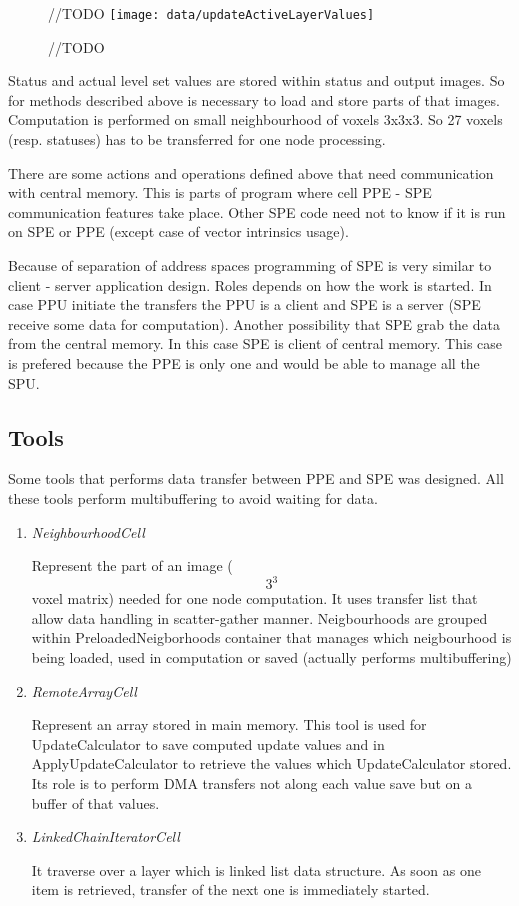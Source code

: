 \begin{figure}	//TODO
    \centering
    \texttt{[image: data/updateActiveLayerValues]}
    \caption[Diagram of new design components]{//TODO}
    \label{fg:updateActiveLayerValues}
\end{figure}

Status and actual level set values are stored within status and output images.
So for methods described above is necessary to load and store parts of that images.
Computation is performed on small neighbourhood of voxels 3x3x3.
So 27 voxels (resp. statuses) has to be transferred for one node processing.

There are some actions and operations defined above that need communication with central memory.
This is parts of program where cell PPE - SPE communication features take place.
Other SPE code need not to know if it is run on SPE or PPE (except case of vector intrinsics usage).

Because of separation of address spaces programming of SPE is very similar to client - server application design.
Roles depends on how the work is started.
In case PPU initiate the transfers the PPU is a client and SPE is a server (SPE receive some data for computation).
Another possibility that SPE grab the data from the central memory.
In this case SPE is client of central memory.
This case is prefered because the PPE is only one and would be able to manage all the SPU.

\subsection{Tools}
Some tools that performs data transfer between PPE and SPE was designed.
All these tools perform multibuffering to avoid waiting for data.

\begin{enumerate}
\item \emph{NeighbourhoodCell}
\par
Represent the part of an image ($$3^3$$ voxel matrix) needed for one node computation.
It uses transfer list that allow data handling in scatter-gather manner.
Neigbourhoods are grouped within PreloadedNeigborhoods container that manages which neigbourhood is being loaded, used in computation or saved (actually performs multibuffering)

\item \emph{RemoteArrayCell}
\par
Represent an array stored in main memory.
This tool is used for UpdateCalculator to save computed update values and in ApplyUpdateCalculator to retrieve the values which UpdateCalculator stored.
Its role is to perform DMA transfers not along each value save but on a buffer of that values.

\item \emph{LinkedChainIteratorCell}
\par
It traverse over a layer which is linked list data structure.
As soon as one item is retrieved, transfer of the next one is immediately started.
\end{enumerate}


